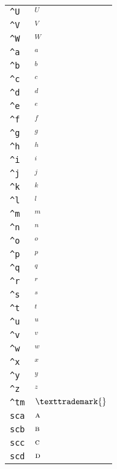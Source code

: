 \begin{longtable}{ll}
\texttt{\textasciicircum U}&${}^U{}$\\
\texttt{\textasciicircum V}&${}^V{}$\\
\texttt{\textasciicircum W}&${}^W{}$\\
\texttt{\textasciicircum a}&${}^a{}$\\
\texttt{\textasciicircum b}&${}^b{}$\\
\texttt{\textasciicircum c}&${}^c{}$\\
\texttt{\textasciicircum d}&${}^d{}$\\
\texttt{\textasciicircum e}&${}^e{}$\\
\texttt{\textasciicircum f}&${}^f{}$\\
\texttt{\textasciicircum g}&${}^g{}$\\
\texttt{\textasciicircum h}&${}^h{}$\\
\texttt{\textasciicircum i}&${}^i{}$\\
\texttt{\textasciicircum j}&${}^j{}$\\
\texttt{\textasciicircum k}&${}^k{}$\\
\texttt{\textasciicircum l}&${}^l{}$\\
\texttt{\textasciicircum m}&${}^m{}$\\
\texttt{\textasciicircum n}&${}^n{}$\\
\texttt{\textasciicircum o}&${}^o{}$\\
\texttt{\textasciicircum p}&${}^p{}$\\
\texttt{\textasciicircum q}&${}^q{}$\\
\texttt{\textasciicircum r}&${}^r{}$\\
\texttt{\textasciicircum s}&${}^s{}$\\
\texttt{\textasciicircum t}&${}^t{}$\\
\texttt{\textasciicircum u}&${}^u{}$\\
\texttt{\textasciicircum v}&${}^v{}$\\
\texttt{\textasciicircum w}&${}^w{}$\\
\texttt{\textasciicircum x}&${}^x{}$\\
\texttt{\textasciicircum y}&${}^y{}$\\
\texttt{\textasciicircum z}&${}^z{}$\\
\texttt{\textasciicircum tm}&${}\texttrademark{}$\\
\texttt{sca}&${}\textsc{a}{}$\\
\texttt{scb}&${}\textsc{b}{}$\\
\texttt{scc}&${}\textsc{c}{}$\\
\texttt{scd}&${}\textsc{d}{}$\\

\end{longtable}
